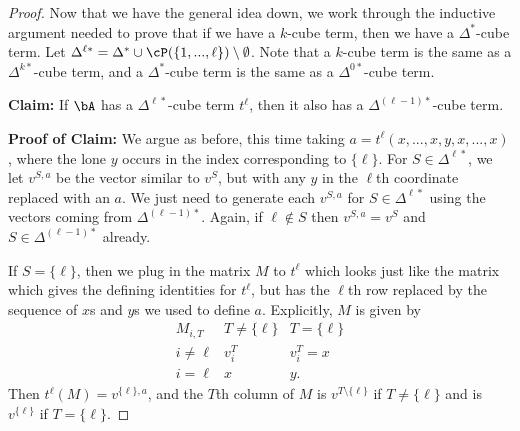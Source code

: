 \begin{proof}
Now that we have the general idea down, we work through the inductive argument needed to prove that if we have a $k$-cube term, then we have a $\Delta^*$-cube term. Let $\Delta^{\ell *} = \Delta^* \cup \cP(\{1,..., \ell\})\setminus \emptyset$. Note that a $k$-cube term is the same as a $\Delta^{k *}$-cube term, and a $\Delta^*$-cube term is the same as a $\Delta^{0*}$-cube term.

{\bf Claim:} If $\bA$ has a $\Delta^{\ell *}$-cube term $t^\ell$, then it also has a $\Delta^{(\ell -1)*}$-cube term.

{\bf Proof of Claim:} We argue as before, this time taking $a = t^\ell(x,...,x,y,x,...,x)$, where the lone $y$ occurs in the index corresponding to $\{\ell\}$. For $S \in \Delta^{\ell *}$, we let $v^{S,a}$ be the vector similar to $v^S$, but with any $y$ in the $\ell$th coordinate replaced with an $a$. We just need to generate each $v^{S,a}$ for $S \in \Delta^{\ell *}$ using the vectors coming from $\Delta^{(\ell-1)*}$. Again, if $\ell \not\in S$ then $v^{S,a} = v^S$ and $S \in \Delta^{(\ell-1)*}$ already.

If $S = \{\ell\}$, then we plug in the matrix $M$ to $t^\ell$ which looks just like the matrix which gives the defining identities for $t^\ell$, but has the $\ell$th row replaced by the sequence of $x$s and $y$s we used to define $a$. Explicitly, $M$ is given by
\[
\begin{array}{c|cc} M_{i,T} & T \ne \{\ell\} & T = \{\ell\}\\ \hline i \ne \ell & v^T_i & v^T_i=x\\ i = \ell & x & y.\end{array}
\]
Then $t^\ell(M) = v^{\{\ell\},a}$, and the $T$th column of $M$ is $v^{T\setminus\{\ell\}}$ if $T \ne \{\ell\}$ and is $v^{\{\ell\}}$ if $T = \{\ell\}$.


\end{proof}
